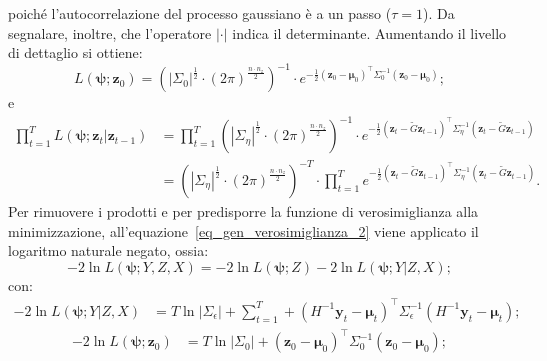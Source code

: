 poiché l'autocorrelazione del processo gaussiano è a un passo ($\tau = 1$). Da segnalare, inoltre, che l'operatore $|\cdot|$ indica il determinante. Aumentando il livello di dettaglio si ottiene:
\begin{equation}
	L(\boldsymbol{\psi}; \mathbf{z}_0) = \left(|\Sigma_0|^\frac{1}{2}\cdot\left(2\pi\right)^\frac{n\cdot n_z}{2}\right)^{-1}\cdot e^{-\frac{1}{2}\left(\mathbf{z}_0 - \boldsymbol{\mu}_0 \right)^\top\Sigma_0^{-1}\left(\mathbf{z}_0 - \boldsymbol{\mu}_0 \right)};
\end{equation}
e
\begin{equation}
	\begin{split}
		\prod_{t=1}^{T}L(\boldsymbol{\psi};\mathbf{z}_t|\mathbf{z}_{t-1}) & = \prod_{t=1}^{T}\left(|\Sigma_\eta|^\frac{1}{2}\cdot\left(2\pi\right)^\frac{n\cdot n_z}{2}\right)^{-1}\cdot e^{-\frac{1}{2}\left(\mathbf{z}_t - \tilde{G}\boldsymbol{z}_{t-1} \right)^\top\Sigma_\eta^{-1}\left(\mathbf{z}_t - \tilde{G}\boldsymbol{z}_{t-1} \right)}\\
		& = \left(|\Sigma_\eta|^\frac{1}{2}\cdot\left(2\pi\right)^\frac{n\cdot n_z}{2}\right)^{-T}\cdot\prod_{t=1}^{T}e^{-\frac{1}{2}\left(\mathbf{z}_t - \tilde{G}\boldsymbol{z}_{t-1} \right)^\top\Sigma_\eta^{-1}\left(\mathbf{z}_t - \tilde{G}\boldsymbol{z}_{t-1} \right)}.
	\end{split}
\end{equation}
Per rimuovere i prodotti e per predisporre la funzione di verosimiglianza alla minimizzazione, all'equazione~\ref{eq_gen_verosimiglianza_2} viene applicato il logaritmo naturale negato, ossia:
\begin{equation}
	-2\ln L(\boldsymbol{\psi}; Y, Z, X) = -2\ln L(\boldsymbol{\psi}; Z) - 2\ln L(\boldsymbol{\psi}; Y|Z,X);
\end{equation}
con:
\begin{equation}
	\begin{split}
		- 2\ln L(\boldsymbol{\psi}; Y|Z,X) & = T\ln|\Sigma_\epsilon| +\sum_{t=1}^{T}+\left(H^{-1}\mathbf{y}_t - \boldsymbol{\mu}_t\right)^\top\Sigma_\epsilon^{-1}\left(H^{-1}\mathbf{y}_t - \boldsymbol{\mu}_t\right);
	\end{split}
\end{equation}
\begin{equation}
	\begin{split}
		- 2\ln L(\boldsymbol{\psi}; \mathbf{z}_0) & = T\ln|\Sigma_0| + \left(\mathbf{z}_0 - \boldsymbol{\mu}_0 \right)^\top\Sigma_0^{-1}\left(\mathbf{z}_0 - \boldsymbol{\mu}_0 \right);
	\end{split}
\end{equation}
